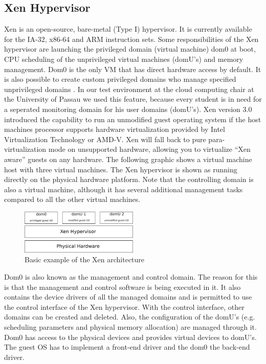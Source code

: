 \documentclass[sigconf]{acmart}
\begin{document}
\subsection{Xen Hypervisor}
Xen is an open-source, bare-metal (Type I) hypervisor. It is currently available for the IA-32, x86-64 and ARM instruction sets. Some responsibilities of the Xen hypervisor are launching the privileged domain (virtual machine) dom0 at boot, CPU scheduling of the unprivileged virtual machines (domU's) and memory management. Dom0 is the only VM that has direct hardware access by default. It is also possible to create custom privileged domains who manage specified unprivileged domains \cite{7847045}. In our test environment at the cloud computing chair at the University of Passau we used this feature, because every student is in need for a seperated monitoring domain for his user domains (domU's).
\newline
\newline
Xen version 3.0 introduced the capability to run an unmodified guest operating system if the host machines processor supports hardware virtualization provided by Intel Virtualization Technology \cite{abels2005overview} or AMD-V. Xen will fall back to pure para-virtualization mode on unsupported hardware, allowing you to virtualize ``Xen aware'' guests on any hardware.
\newline
\newline
The following graphic shows a virtual machine host with three virtual machines. The Xen hypervisor is shown as running directly on the physical hardware platform. Note that the controlling domain is also a virtual machine, although it has several additional management tasks compared to all the other virtual machines.
\newline
\begin{figure}[h]
\centering
\includegraphics[width=0.5\textwidth]{xen-architecture}
\caption{Basic example of the Xen architecture}
\end{figure}
\newline
Dom0 is also known as the management and control domain. The reason for this is that the management and control software is being executed in it. It also contains the device drivers of all the managed domains and is permitted to use the control interface of the Xen hypervisor. With the control interface, other domains can be created and deleted. Also, the configuration of the domU's (e.g. scheduling parameters and physical memory allocation) are managed through it. Dom0 has access to the physical devices and provides virtual devices to domU's. The guest OS has to implement a front-end driver and the dom0 the back-end driver.
\end{document}
